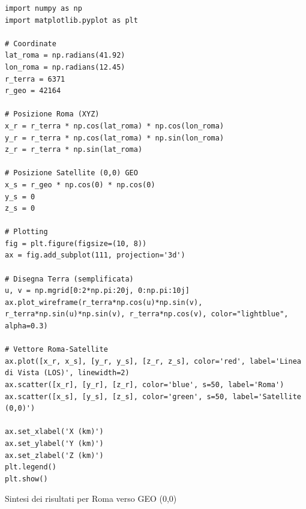 \documentclass[a4paper,14pt]{article}
\begin{document}
{
\scriptsize
\begin{verbatim}
import numpy as np
import matplotlib.pyplot as plt

# Coordinate
lat_roma = np.radians(41.92)
lon_roma = np.radians(12.45)
r_terra = 6371
r_geo = 42164

# Posizione Roma (XYZ)
x_r = r_terra * np.cos(lat_roma) * np.cos(lon_roma)
y_r = r_terra * np.cos(lat_roma) * np.sin(lon_roma)
z_r = r_terra * np.sin(lat_roma)

# Posizione Satellite (0,0) GEO
x_s = r_geo * np.cos(0) * np.cos(0)
y_s = 0
z_s = 0

# Plotting
fig = plt.figure(figsize=(10, 8))
ax = fig.add_subplot(111, projection='3d')

# Disegna Terra (semplificata)
u, v = np.mgrid[0:2*np.pi:20j, 0:np.pi:10j]
ax.plot_wireframe(r_terra*np.cos(u)*np.sin(v), r_terra*np.sin(u)*np.sin(v), r_terra*np.cos(v), color="lightblue", alpha=0.3)

# Vettore Roma-Satellite
ax.plot([x_r, x_s], [y_r, y_s], [z_r, z_s], color='red', label='Linea di Vista (LOS)', linewidth=2)
ax.scatter([x_r], [y_r], [z_r], color='blue', s=50, label='Roma')
ax.scatter([x_s], [y_s], [z_s], color='green', s=50, label='Satellite (0,0)')

ax.set_xlabel('X (km)')
ax.set_ylabel('Y (km)')
ax.set_zlabel('Z (km)')
plt.legend()
plt.show()

\end{verbatim}
}
Sintesi dei risultati per Roma verso GEO (0,0)
\end{document}
